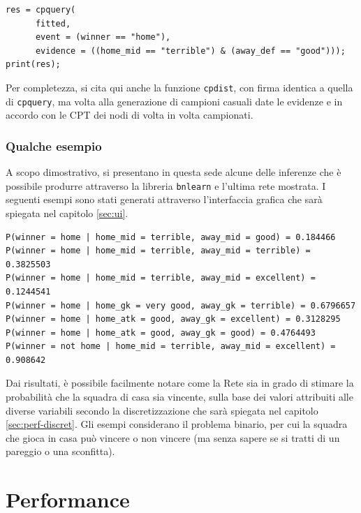 \documentclass[hidelinks, 12pt]{article}
\begin{document}
\begin{verbatim}
res = cpquery(
      fitted,
      event = (winner == "home"),
      evidence = ((home_mid == "terrible") & (away_def == "good")));
print(res);
\end{verbatim}

\vspace{2ex}

Per completezza, si cita qui anche la funzione \texttt{cpdist}, con firma identica a quella di \texttt{cpquery}, ma volta alla generazione di campioni casuali date le evidenze e in accordo con le CPT dei nodi di volta in volta campionati.


\subsubsection{Qualche esempio}

A scopo dimostrativo, si presentano in questa sede alcune delle inferenze che è possibile produrre attraverso la libreria \texttt{bnlearn} e l'ultima rete mostrata. I seguenti esempi sono stati generati attraverso l'interfaccia grafica che sarà spiegata nel capitolo \ref{sec:ui}.

\begin{verbatim}
P(winner = home | home_mid = terrible, away_mid = good) = 0.184466
P(winner = home | home_mid = terrible, away_mid = terrible) = 0.3825503
P(winner = home | home_mid = terrible, away_mid = excellent) = 0.1244541
P(winner = home | home_gk = very good, away_gk = terrible) = 0.6796657
P(winner = home | home_atk = good, away_gk = excellent) = 0.3128295
P(winner = home | home_atk = good, away_gk = good) = 0.4764493
P(winner = not home | home_mid = terrible, away_mid = excellent) = 0.908642
\end{verbatim}

Dai risultati, è possibile facilmente notare come la Rete sia in grado di stimare la probabilità che la squadra di casa sia vincente, sulla base dei valori attribuiti alle diverse variabili secondo la discretizzazione che sarà spiegata nel capitolo \ref{sec:perf-discret}. Gli esempi considerano il problema binario, per cui la squadra che gioca in casa può vincere o non vincere (ma senza sapere se si tratti di un pareggio o una sconfitta).



\clearpage



\section{Performance}
\end{document}
